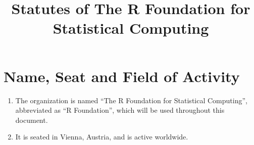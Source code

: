 \documentclass[a4paper]{article}
\title{\bf Statutes of The R Foundation for Statistical Computing}
\newcommand{\RF}{``R Foundation''}
\begin{document}
\maketitle








\section{Name, Seat and Field of Activity}

\begin{enumerate}
  \item The organization is named ``The R Foundation for Statistical
   Computing'', abbreviated as \RF{}, which will be used
   throughout this document.
 \item It is seated in Vienna, Austria, and is active worldwide.
\end{enumerate}
\end{document}
